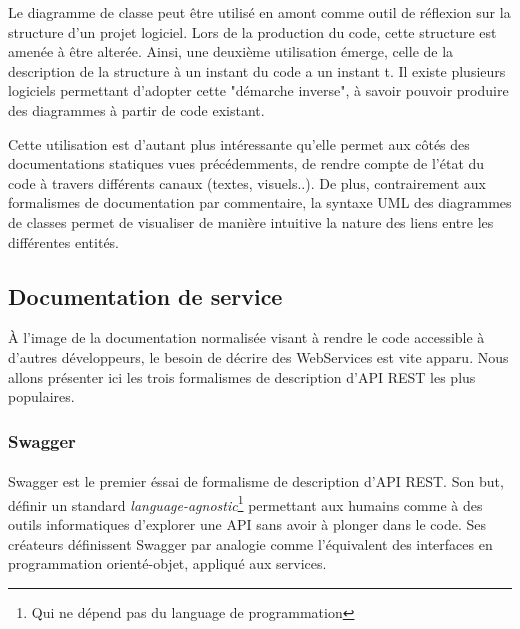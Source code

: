 Le diagramme de classe peut être utilisé en amont comme outil de réflexion sur la structure
d'un projet logiciel. Lors de la production du code, cette structure est amenée à être alterée.
Ainsi, une deuxième utilisation émerge, celle de la description de la structure à un instant du code
a un instant t.
Il existe plusieurs logiciels permettant d'adopter cette "démarche inverse", à savoir pouvoir
produire des diagrammes à partir de code existant.

Cette utilisation est d'autant plus intéressante qu'elle permet aux côtés des documentations
statiques vues précédemments, de rendre compte de l'état du code à travers différents
canaux (textes, visuels..). De plus, contrairement aux formalismes de documentation par commentaire,
la syntaxe UML des diagrammes de classes permet de visualiser de manière intuitive la nature des
liens entre les différentes entités.

\newpage
\subsection{Documentation de service}
À l'image de la documentation normalisée visant à rendre le code accessible à d'autres développeurs,
le besoin de décrire des WebServices est vite apparu. Nous allons présenter ici les trois formalismes
de description d'API REST les plus populaires.

    \subsubsection{Swagger}
        \paragraph{}
            Swagger est le premier éssai de formalisme de description d'API REST. Son but, définir un
            standard \textit{language-agnostic}\footnote{Qui ne dépend pas du language de programmation}
            permettant aux humains comme à des outils informatiques d'explorer une API sans avoir à
            plonger dans le code. \label{swaggerdef} Ses créateurs définissent Swagger\cite{Swagger} par analogie comme
            l'équivalent des interfaces en programmation orienté-objet, appliqué aux services.


